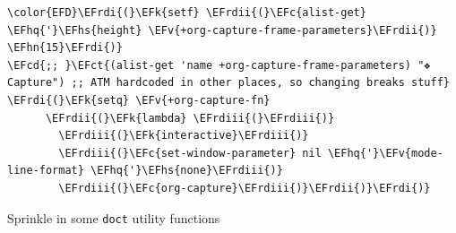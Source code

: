 \documentclass{scrartcl}
\newcommand{\EFk}[1]{\textcolor{EFk}{#1}} %
\newcommand{\EFct}[1]{\textcolor{EFct}{#1}} %
\newcommand{\EFc}[1]{\textcolor{EFc}{#1}} %
\newcommand{\EFv}[1]{\textcolor{EFv}{#1}} %
\newcommand{\EFcd}[1]{\textcolor{EFcd}{#1}} %
\newcommand{\EFhn}[1]{\textcolor{EFhn}{\textbf{#1}}} %
\newcommand{\EFhq}[1]{\textcolor{EFhq}{#1}} %
\newcommand{\EFhs}[1]{\textcolor{EFhs}{#1}} %
\newcommand{\EFrdi}[1]{\textcolor{EFrdi}{#1}} %
\newcommand{\EFrdii}[1]{\textcolor{EFrdii}{#1}} %
\newcommand{\EFrdiii}[1]{\textcolor{EFrdiii}{#1}} %
\begin{document}
\begin{Code}
\begin{Verbatim}[]
\color{EFD}\EFrdi{(}\EFk{setf} \EFrdii{(}\EFc{alist-get} \EFhq{'}\EFhs{height} \EFv{+org-capture-frame-parameters}\EFrdii{)} \EFhn{15}\EFrdi{)}
\EFcd{;; }\EFct{(alist-get 'name +org-capture-frame-parameters) "❖ Capture") ;; ATM hardcoded in other places, so changing breaks stuff}
\EFrdi{(}\EFk{setq} \EFv{+org-capture-fn}
      \EFrdii{(}\EFk{lambda} \EFrdiii{(}\EFrdiii{)}
        \EFrdiii{(}\EFk{interactive}\EFrdiii{)}
        \EFrdiii{(}\EFc{set-window-parameter} nil \EFhq{'}\EFv{mode-line-format} \EFhq{'}\EFhs{none}\EFrdiii{)}
        \EFrdiii{(}\EFc{org-capture}\EFrdiii{)}\EFrdii{)}\EFrdi{)}
\end{Verbatim}
\end{Code}

Sprinkle in some \texttt{doct} utility functions
\end{document}
